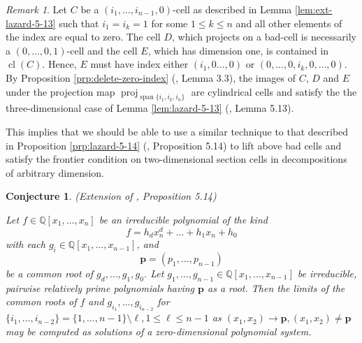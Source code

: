 \documentclass[
]{book}
\newtheorem{conjecture}{Conjecture}[chapter]
\theoremstyle{definition}
\theoremstyle{definition}
\theoremstyle{definition}
\theoremstyle{definition}
\theoremstyle{remark}
\newtheorem*{remark}{Remark}
\begin{document}
\begin{remark}
Let \(C\) be a \((i_1,\ldots,i_{n-1},0)\)-cell as described in Lemma \ref{lem:ext-lazard-5-13} such that \(i_1=i_k = 1\) for some \(1 \le k \le n\) and all other elements of the index are equal to zero.
The cell \(D\), which projects on a bad-cell is necessarily a \((0,\ldots,0,1)\)-cell and the cell \(E\), which has dimension one, is contained in \({\operatorname{cl} \left( C \right)}\). Hence, \(E\) must have index either \((i_1,0\ldots,0)\) or \((0,\ldots,0,i_k,0,\ldots,0)\).
By Proposition \ref{prp:delete-zero-index} (\citet{bgv15}, Lemma 3.3), the images of \(C\), \(D\) and \(E\) under the projection map \({\operatorname{proj}_{{\operatorname{span} \{i_1,i_k,i_n\}}}}\) are cylindrical cells and satisfy the the three-dimensional case of Lemma \ref{lem:lazard-5-13} (\citet{lazard10}, Lemma 5.13).
\end{remark}

This implies that we should be able to use a similar technique to that described in Proposition \ref{prp:lazard-5-14} (\citet{lazard10}, Proposition 5.14) to lift above bad cells and satisfy the frontier condition on two-dimensional section cells in decompositions of arbitrary dimension.

\begin{conjecture}
\protect\hypertarget{cnj:ext-lazard-5-14}{}\label{cnj:ext-lazard-5-14}(Extension of \citet{lazard10}, Proposition 5.14)

Let \(f \in \mathbb{Q}[x_1,\ldots,x_n]\) be an irreducible polynomial of the kind
\[f = h_dx_n^d + \ldots + h_1x_n + h_0\]
with each \(g_i \in \mathbb{Q}[x_1,\ldots,x_{n-1}]\), and
\[\mathbf{p} = (p_1,\ldots,p_{n-1})\]
be a common root of \(g_d,\ldots,g_1,g_0\).
Let \(g_1,\ldots,g_{n-1}\in \mathbb{Q}[x_1,\ldots,x_{n-1}]\) be irreducible, pairwise relatively prime polynomials having \(\mathbf{p}\) as a root.
Then the limits of the common roots of \(f\) and \(g_{i_1},\ldots,g_{i_{n-2}}\) for \(\{i_1,\ldots,i_{n-2}\} = \{1,\ldots,n-1\} \setminus \ell, 1 \le \ell \le n-1\) as \((x_1, x_2) \to \mathbf{p}, (x_1, x_2) \ne \mathbf{p}\) may be computed as solutions of a zero-dimensional
polynomial system.
\end{conjecture}
\end{document}
